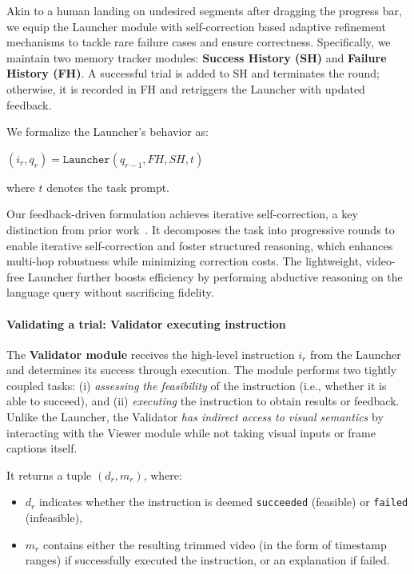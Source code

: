 Akin to a human landing on undesired segments after dragging the progress bar, we equip the Launcher module with self-correction based adaptive refinement mechanisms to tackle rare failure cases and ensure correctness. Specifically, we maintain two memory tracker modules: \textbf{Success History (SH)} and \textbf{Failure History (FH)}. A successful trial is added to SH and terminates the round; otherwise, it is recorded in FH and retriggers the Launcher with updated feedback.

We formalize the Launcher's behavior as:
\begin{center}
$(i_r, q_r) = \texttt{Launcher}(q_{r-1}, FH, SH, t)$
\end{center}
where $t$ denotes the task prompt.

Our feedback-driven formulation achieves iterative self-correction, a key distinction from prior work~\citep{VideoAgent, shang-etal-2024-traveler}. It decomposes the task into progressive rounds to enable iterative self-correction and foster structured reasoning, which enhances multi-hop robustness while minimizing correction costs. The lightweight, video-free Launcher further boosts efficiency by performing abductive reasoning on the language query without sacrificing fidelity.

\paragraph{Validating a trial: Validator executing instruction}

The \textbf{Validator module} receives the high-level instruction $i_r$ from the Launcher and determines its success through execution. The module performs two tightly coupled tasks:  
(i) \textit{assessing the feasibility} of the instruction (i.e., whether it is able to succeed), and  
(ii) \textit{executing} the instruction to obtain results or feedback.
Unlike the Launcher, the Validator \textit{has indirect access to visual semantics} by interacting with the Viewer module while not taking visual inputs or frame captions itself.

It returns a tuple $(d_r, m_r)$, where:
\begin{itemize}
  \item $d_r$ indicates whether the instruction is deemed \texttt{succeeded} (feasible) or \texttt{failed} (infeasible),
  \item $m_r$ contains either the resulting trimmed video (in the form of timestamp ranges) if successfully executed the instruction, or an explanation if failed.
\end{itemize}

